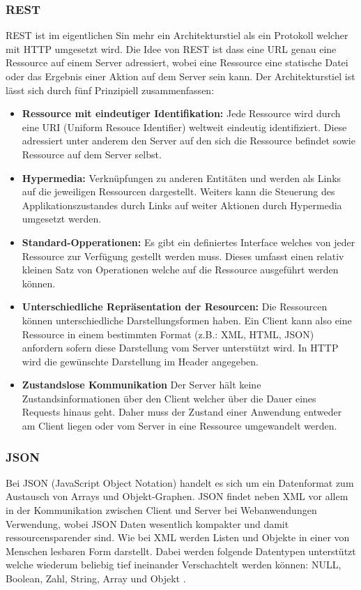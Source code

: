 \subsubsection{REST}
\label{sec:HTTP}
REST ist im eigentlichen Sin mehr ein Architekturstiel als ein Protokoll welcher mit HTTP umgesetzt wird.
Die Idee von REST ist dass eine URL genau eine Ressource auf einem Server adressiert, 
wobei eine Ressource eine statische Datei oder das Ergebnis einer Aktion auf dem Server sein kann.
Der Architekturstiel ist lässt sich durch fünf Prinzipiell zusammenfassen:
\begin{itemize}
	\item \textbf{Ressource mit eindeutiger Identifikation:}
		Jede Ressource wird durch eine URI (Uniform Resouce Identifier) weltweit eindeutig identifiziert.
		Diese adressiert unter anderem den Server auf den sich die Ressource befindet sowie Ressource auf dem Server selbst.
	\item \textbf{Hypermedia:}
		Verknüpfungen zu anderen Entitäten und werden als Links auf die jeweiligen Ressourcen dargestellt.
		Weiters kann die Steuerung des Applikationszustandes durch Links auf weiter Aktionen durch Hypermedia umgesetzt werden.
	\item \textbf{Standard-Opperationen:}
		Es gibt ein definiertes Interface welches von jeder Ressource zur Verfügung gestellt werden muss.
		Dieses umfasst einen relativ kleinen Satz von Operationen welche auf die Ressource ausgeführt werden können.
	\item \textbf{Unterschiedliche Repräsentation der Resourcen:}
		Die Ressourcen können unterschiedliche Darstellungsformen haben.
		Ein Client kann also eine Ressource in einem bestimmten Format (z.B.: XML, HTML, JSON) anfordern sofern diese Darstellung vom Server unterstützt wird.
		In HTTP wird die gewünschte Darstellung im Header angegeben.
	\item \textbf{Zustandslose Kommunikation}
		Der Server hält keine Zustandsinformationen über den Client welcher über die Dauer eines Requests hinaus geht.
		Daher muss der Zustand einer Anwendung entweder am Client liegen oder vom Server in eine Ressource umgewandelt werden.
\end{itemize}
\cite{rest}

\subsubsection{JSON}
\label{sec:JSON}
Bei JSON (JavaScript Object Notation) handelt es sich um ein Datenformat zum Austausch von Arrays und Objekt-Graphen.
JSON findet neben XML vor allem in der Kommunikation zwischen Client und Server bei Webanwendungen Verwendung, 
wobei JSON Daten wesentlich kompakter und damit ressourcensparender sind.
Wie bei XML werden Listen und Objekte in einer von Menschen lesbaren Form darstellt.
Dabei werden folgende Datentypen unterstützt welche wiederum beliebig tief ineinander Verschachtelt werden können: NULL, Boolean, Zahl, String, Array und Objekt \cite{ajax}.

